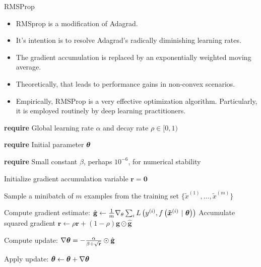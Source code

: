 \documentclass[11pt,compress,t,notes=noshow, xcolor=table]{beamer}
\begin{document}
\begin{vbframe}{RMSProp}
	\begin{itemize}
		\item RMSprop is a modification of Adagrad.
		\item It's intention is to resolve Adagrad's radically diminishing learning rates.
		\item The gradient accumulation is replaced by an exponentially weighted moving average.
		\item Theoretically, that leads to performance gains in non-convex scenarios.
		\item Empirically, RMSProp is a very effective optimization algorithm. Particularly, it is employed routinely by deep learning practitioners.
	\end{itemize}
	
	\framebreak
	
	
	\begin{algorithm}[H]
		\small
		\caption{RMSProp}
		\begin{algorithmic}[1]
			\State \textbf{require} Global learning rate $\alpha$ and decay rate $\rho \in [0, 1)$ \strut
			\State \textbf{require} Initial parameter $\mathbf{\bm{\theta}}$ \strut
			\State \parbox[t]{\dimexpr\linewidth-\algorithmicindent}{\textbf{require} Small constant $\beta$, perhaps $10^{-6}$, for numerical stability \strut}
			\State Initialize gradient accumulation variable $\mathbf{r} = \mathbf{0} $
			\State \parbox[t]{\dimexpr\linewidth-\algorithmicindent}{Sample a minibatch of $m$ examples from the training set $\{\tilde{x}^{(1)},\dots,\tilde{x}^{(m)}\}$ \strut}
			\State Compute gradient estimate: $\hat{\mathbf{g}} \leftarrow \frac{1}{m} \nabla_\theta \sum_{i} L\left(y^{(i)}, f\left(\bm{\tilde{x}}^{(i)} ~|~ \bm{\theta}\right)\right)$
			\State Accumulate squared gradient $\mathbf{r} \leftarrow \rho \mathbf{r} + (1 - \rho) \hat{\mathbf{g}} \odot  \hat{\mathbf{g}}$
			\State \parbox[t]{\dimexpr\linewidth-\algorithmicindent}{Compute update: $\nabla\mathbf{\bm{\theta}} = - \frac{\alpha}{\beta + \sqrt\mathbf{r}} \odot \hat{\mathbf{g}}$ \strut}
			\State Apply update: $\mathbf{\bm{\theta}} \leftarrow \mathbf{\bm{\theta}} + \nabla\mathbf{\bm{\theta}}$
			\EndWhile
		\end{algorithmic}
	\end{algorithm}
\end{vbframe}
\end{document}
